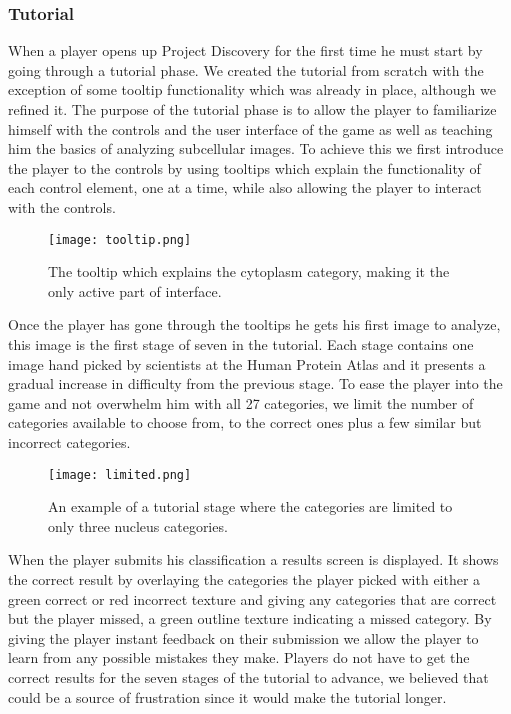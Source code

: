 	\subsubsection{Tutorial}
		When a player opens up Project Discovery for the first time he must start by going through a tutorial phase. We created the tutorial from scratch with the exception of some tooltip functionality which was already in place, although we refined it. The purpose of the tutorial phase is to allow the player to familiarize himself with the controls and the user interface of the game as well as teaching him the basics of analyzing subcellular images. To achieve this we first introduce the player to the controls by using tooltips which explain the functionality of each control element, one at a time, while also allowing the player to interact with the controls. 

		\begin{figure}[H]
		  \centering
		  \graphicspath{ {./graphics/} }
		  \centerline{\texttt{[image: tooltip.png]}}
		  \caption{\label{fig:tooltip}The tooltip which explains the cytoplasm category, making it the only active part of interface.}
		\end{figure}

		Once the player has gone through the tooltips he gets his first image to analyze, this image is the first stage of seven in the tutorial. Each stage contains one image hand picked by scientists at the Human Protein Atlas and it presents a gradual increase in difficulty from the previous stage. To ease the player into the game and not overwhelm him with all 27 categories, we limit the number of categories available to choose from, to the correct ones plus a few similar but incorrect categories.

		\begin{figure}[H]
		  \centering
		  \graphicspath{ {./graphics/} }
		  \centerline{\texttt{[image: limited.png]}}
		  \caption{\label{fig:limited}An example of a tutorial stage where the categories are limited to only three nucleus categories.}
		\end{figure}

		When the player submits his classification a results screen is displayed. It shows the correct result by overlaying the categories the player picked with either a green correct or red incorrect texture and giving any categories that are correct but the player missed, a green outline texture indicating a missed category. By giving the player instant feedback on their submission we allow the player to learn from any possible mistakes they make. Players do not have to get the correct results for the seven stages of the tutorial to advance, we believed that could be a source of frustration since it would make the tutorial longer. 

